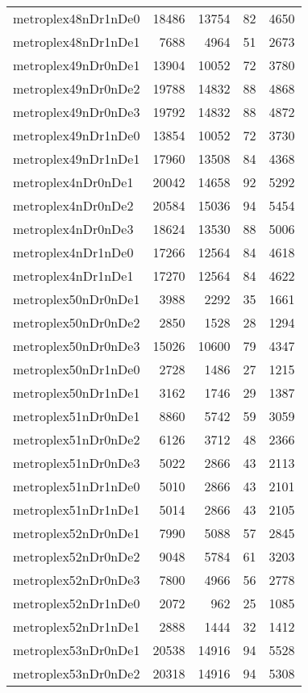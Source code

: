 \begin{longtable}{lrrrr}
metroplex48nDr1nDe0 & 18486 & 13754 & 82 & 4650 \\
metroplex48nDr1nDe1 & 7688 & 4964 & 51 & 2673 \\
metroplex49nDr0nDe1 & 13904 & 10052 & 72 & 3780 \\
metroplex49nDr0nDe2 & 19788 & 14832 & 88 & 4868 \\
metroplex49nDr0nDe3 & 19792 & 14832 & 88 & 4872 \\
metroplex49nDr1nDe0 & 13854 & 10052 & 72 & 3730 \\
metroplex49nDr1nDe1 & 17960 & 13508 & 84 & 4368 \\
metroplex4nDr0nDe1 & 20042 & 14658 & 92 & 5292 \\
metroplex4nDr0nDe2 & 20584 & 15036 & 94 & 5454 \\
metroplex4nDr0nDe3 & 18624 & 13530 & 88 & 5006 \\
metroplex4nDr1nDe0 & 17266 & 12564 & 84 & 4618 \\
metroplex4nDr1nDe1 & 17270 & 12564 & 84 & 4622 \\
metroplex50nDr0nDe1 & 3988 & 2292 & 35 & 1661 \\
metroplex50nDr0nDe2 & 2850 & 1528 & 28 & 1294 \\
metroplex50nDr0nDe3 & 15026 & 10600 & 79 & 4347 \\
metroplex50nDr1nDe0 & 2728 & 1486 & 27 & 1215 \\
metroplex50nDr1nDe1 & 3162 & 1746 & 29 & 1387 \\
metroplex51nDr0nDe1 & 8860 & 5742 & 59 & 3059 \\
metroplex51nDr0nDe2 & 6126 & 3712 & 48 & 2366 \\
metroplex51nDr0nDe3 & 5022 & 2866 & 43 & 2113 \\
metroplex51nDr1nDe0 & 5010 & 2866 & 43 & 2101 \\
metroplex51nDr1nDe1 & 5014 & 2866 & 43 & 2105 \\
metroplex52nDr0nDe1 & 7990 & 5088 & 57 & 2845 \\
metroplex52nDr0nDe2 & 9048 & 5784 & 61 & 3203 \\
metroplex52nDr0nDe3 & 7800 & 4966 & 56 & 2778 \\
metroplex52nDr1nDe0 & 2072 & 962 & 25 & 1085 \\
metroplex52nDr1nDe1 & 2888 & 1444 & 32 & 1412 \\
metroplex53nDr0nDe1 & 20538 & 14916 & 94 & 5528 \\
metroplex53nDr0nDe2 & 20318 & 14916 & 94 & 5308 \\

\end{longtable}
